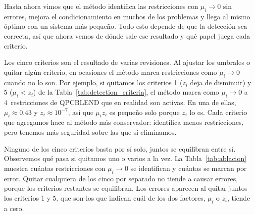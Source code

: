 Hasta ahora vimos que el método identifica las restricciones con $\mu_i \to 0$ sin errores, mejora el condicionamiento en muchos de los problemas y llega al mismo óptimo con un sistema más pequeño. Todo esto depende de que la detección sea correcta, así que ahora vemos de dónde sale ese resultado y qué papel juega cada criterio.

Los cinco criterios son el resultado de varias revisiones. Al ajustar los umbrales o quitar algún criterio, en ocasiones el método marca restricciones como $\mu_i \to 0$ cuando no lo son. Por ejemplo, si quitamos los criterios 1 ($z_i$ deja de disminuir) y 5 ($\mu_i < z_i$) de la Tabla~\ref{tab:detection_criteria}, el método marca como $\mu_i \to 0$ a 4~restricciones de QPCBLEND que en realidad son activas. En una de ellas, $\mu_i \approx 0.43$ y $z_i \approx 10^{-7}$, así que $\mu_i z_i$ es pequeño solo porque $z_i$ lo es. Cada criterio que agregamos hace al método más conservador: identifica menos restricciones, pero tenemos más seguridad sobre las que sí eliminamos.

Ninguno de los cinco criterios basta por sí solo, juntos se equilibran entre sí. Observemos qué pasa si quitamos uno o varios a la vez. La Tabla~\ref{tab:ablacion} muestra cuántas restricciones con $\mu_i \to 0$ se identifican y cuántas se marcan por error. Quitar cualquiera de los cinco por separado no tiende a causar errores, porque los criterios restantes se equilibran. Los errores aparecen al quitar juntos los criterios 1 y 5, que son los que indican cuál de los dos factores, $\mu_i$ o $z_i$, tiende a cero.

